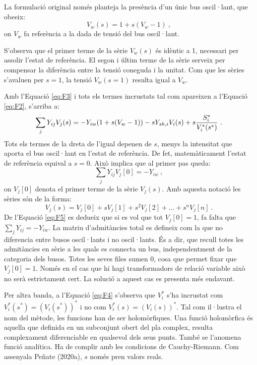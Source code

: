 La formulació original només planteja la presència d'un únic bus oscil·lant, que obeeix:
\begin{equation}
    V_w(s)=1+s(V_w-1)\ ,
        \label{eq:F3}
\end{equation}
on $V_w$ fa referència a la dada de tensió del bus oscil·lant. 

S'observa que el primer terme de la sèrie $V_w(s)$ és idèntic a 1, necessari per assolir l'estat de referència. El segon i últim terme de la sèrie serveix per compensar la diferència entre la tensió coneguda i la unitat. Com que les sèries s'avaluen per $s=1$, la tensió $V_w(s=1)$ resulta igual a $V_w$. 



Amb l'Equació \ref{eq:F3} i tots els termes incrustats tal com apareixen a l'Equació \ref{eq:F2}, s'arriba a:
\begin{equation}
    \sum_{j}Y_{ij}V_j(s) = -Y_{iw}(1+s(V_w-1)) -sY_{sh,i}V_i(s)+s\frac{S^*_i}{V^*_i(s^*)}\ .
        \label{eq:F4}
\end{equation}
Tots els termes de la dreta de l'igual depenen de $s$, menys la intensitat que aporta el bus oscil·lant en l'estat de referència. De fet, matemàticament l'estat de referència equival a $s=0$. Això implica que al primer pas queda:
\begin{equation}
    \sum_{j}Y_{ij}V_j[0] = -Y_{iw}\ ,
        \label{eq:F5}
\end{equation}
on $V_j[0]$ denota el primer terme de la sèrie $V_j(s)$. Amb aquesta notació les sèries són de la forma:
\begin{equation}
    V_j(s)=V_j[0]+sV_j[1]+s^2V_j[2]+...+s^nV_j[n]\ .
        \label{eq:F6}
\end{equation}
De l'Equació \ref{eq:F5} es dedueix que si es vol que tot $V_j[0]=1$, fa falta que $\sum_{j}Y_{ij}=-Y_{iw}$. La matriu d'admitàncies total es defineix com la que no diferencia entre busos oscil·lants i no oscil·lants. És a dir, que recull totes les admitàncies en sèrie a les quals es connecta un bus, independentment de la categoria dels busos. Totes les seves files sumen 0, cosa que permet fixar que $V_j[0]=1$. Només en el cas que hi hagi transformadors de relació variable això no serà estrictament cert. La solució a aquest cas es presenta més endavant.

Per altra banda, a l'Equació \ref{eq:F4} s'observa que $V^*_i$ s'ha incrustat com $V^*_i(s^*)=(V_i(s^*))^*$ i no com $V^*_i(s)=(V_i(s))^*$. Tal com il·lustra el nom del mètode, les funcions han de ser holomòrfiques. Una funció holomòrfica és aquella que definida en un subconjunt obert del pla complex, resulta complexament diferenciable en qualsevol dels seus punts. També se l'anomena funció analítica. Ha de complir amb les condicions de Cauchy-Riemann. Com assenyala Peñate (2020a), $s$ només pren valors reals.

